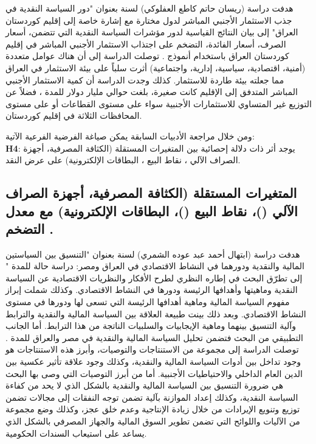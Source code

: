 \documentclass[10pt,a4paper]{report}
\begin{document}
\begin{doublespacing}
هدفت دراسة (ريسان حاتم كاطع العفلوكي) لسنة  بعنوان "دور السياسة النقدية في جذب الاستثمار الأجنبي المباشر لدول مختارة مع إشارة خاصة إلى إقليم كوردستان العراق" إلى بيان النتائج القياسية لدور مؤشرات السياسة النقدية التي تتضمن، أسعار الصرف، أسعار الفائدة، التضخم على اجتذاب الاستثمار الأجنبي المباشر في إقليم كوردستان العراق باستخدام أنموذج . توصلت الدراسة إلى أن هناك عوامل متعددة (أمنية، اقتصادية، سياسية، إدارية، واجتماعية) أثرت سلباً على بيئة الاستثمار في العراق مما جعلته بيئة طاردة للاستثمار. كذلك وجدت الدراسة أن كمية الاستثمار الأجنبي المباشر المتدفق إلى الإقليم كانت صغيرة، بلغت حوالي  مليار دولار للمدة ، فضلاً عن التوزيع غير المتساوي للاستثمارات الأجنبية سواء على مستوى القطاعات أو على مستوى المحافظات الثلاثة في إقليم كوردستان.

ومن خلال مراجعة الأدبيات السابقة يمكن صياغة الفرضية الفرعية الآتية:\\
	\textbf{H4}: يوجد أثر ذات دلالة إحصائية بين المتغيرات المستقلة (الكثافة المصرفية، أجهزة الصراف الآلي ، نقاط البيع ، البطاقات الإلكترونية) على عرض النقد.
\subsection{المتغيرات المستقلة ({الكثافة المصرفية}، {أجهزة الصراف الآلي} ()، {نقاط البيع} ()، {البطاقات الإلكترونية}) مع معدل التضخم   .
}
هدفت دراسة (ابتهال أحمد عبد عوده الشمري) لسنة  بعنوان "التنسيق بين السياستين المالية والنقدية ودورهما في النشاط الاقتصادي في العراق ومصر: دراسة حالة للمدة " إلى تطرّق البحث في إطاره النظري لطرح الأفكار والنظريات الاقتصادية عن السياسة النقدية وماهيتها وأهدافها الرئيسة ودورها في النشاط الاقتصادي. وكذلك شملت إبراز مفهوم السياسة المالية وماهية أهدافها الرئيسة التي تسعى لها ودورها في مستوى النشاط الاقتصادي. وبعد ذلك بينت طبيعة العلاقة بين السياسة المالية والنقدية والترابط وآلية التنسيق بينهما وماهية الإيجابيات والسلبيات الناتجة من هذا الترابط. أما الجانب التطبيقي من البحث فتضمن تحليل السياسة المالية والنقدية في مصر والعراق للمدة . توصلت الدراسة إلى مجموعة من الاستنتاجات والتوصيات، وأبرز هذه الاستنتاجات هو وجود تداخل بين أدوات السياسة المالية والنقدية، وكذلك وجود علاقة تأثير عكسية بين الدين العام الداخلي والاحتياطيات الأجنبية. أما من أبرز التوصيات التي وصى بها البحث هي ضرورة التنسيق بين السياسة المالية والنقدية بالشكل الذي لا يحد من كفاءة السياسة النقدية، وكذلك إعداد الموازنة بآلية تضمن توجه النفقات إلى مجالات تضمن توزيع وتنويع الإيرادات من خلال زيادة الإنتاجية وعدم خلق عجز، وكذلك وضع مجموعة من الآليات واللوائح التي تضمن تطوير السوق المالية والجهاز المصرفي بالشكل الذي يساعد على استيعاب السندات الحكومية.


\end{doublespacing}
\end{document}
